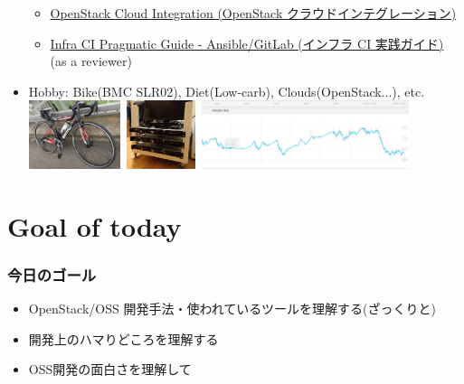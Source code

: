 \documentclass[aspectratio=169,11pt,hyperref={colorlinks=true}]{beamer}
\begin{document}
\begin{frame}
\begin{itemize}
      \begin{itemize}
      \item \href{https://www.amazon.co.jp/dp/4798139785/}{\scriptsize{OpenStack
        Cloud Integration (OpenStack クラウドインテグレーション)}}
      \item \href{https://www.amazon.co.jp/dp/4798155128/}{\scriptsize{Infra CI
        Pragmatic Guide - Ansible/GitLab (インフラ CI 実践ガイド)}} (as a reviewer)
      \end{itemize}
    \item Hobby: Bike(BMC SLR02), Diet(Low-carb), Clouds(OpenStack...), etc.
    \includegraphics[height=20mm]{images/my-bike.jpg}~\includegraphics[height=20mm]{images/server_front.jpg}~\includegraphics[height=20mm]{images/my-weight.png}
  \end{itemize}
\end{frame}

\section{Goal of today}
\begin{frame}
  \frametitle{今日のゴール}
  \begin{itemize}
    \item OpenStack/OSS 開発手法・使われているツールを理解する(ざっくりと)
    \item 開発上のハマりどころを理解する
    \item OSS開発の面白さを理解して
  \end{itemize}
\end{frame}
\end{document}
